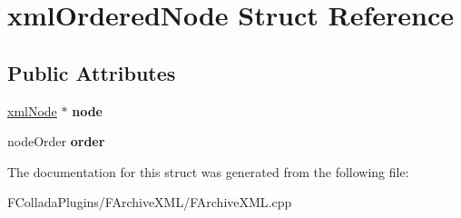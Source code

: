 \hypertarget{structxmlOrderedNode}{
\section{xmlOrderedNode Struct Reference}
\label{structxmlOrderedNode}
}
\subsection*{Public Attributes}
\begin{DoxyCompactItemize}
\item 
\hypertarget{structxmlOrderedNode_a1e65dbce17cb5a372261a792bd28845e}{
\hyperlink{struct__xmlNode}{xmlNode} $\ast$ {\bfseries node}}
\label{structxmlOrderedNode_a1e65dbce17cb5a372261a792bd28845e}

\item 
\hypertarget{structxmlOrderedNode_ae4d2f1749b89328bf22142f1fa70383b}{
nodeOrder {\bfseries order}}
\label{structxmlOrderedNode_ae4d2f1749b89328bf22142f1fa70383b}

\end{DoxyCompactItemize}


The documentation for this struct was generated from the following file:\begin{DoxyCompactItemize}
\item 
FColladaPlugins/FArchiveXML/FArchiveXML.cpp\end{DoxyCompactItemize}
